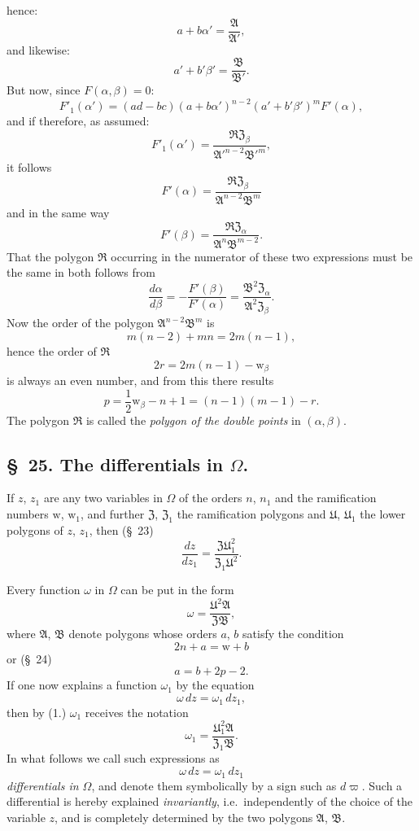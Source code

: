 \documentclass{article}
\begin{document}
hence:
\[ a+b\alpha' = \frac{\mathfrak{A}}{\mathfrak{A}'}, \]
and likewise:
\[ a'+b'\beta' = \frac{\mathfrak{B}}{\mathfrak{B}'}. \]
But now, since $F(\alpha, \beta) = 0$:
\[ F'_{1}(\alpha') = (ad-bc)(a+b\alpha')^{n-2}(a'+b'\beta')^{m}F'(\alpha), \]
and if therefore, as assumed:
\[ F'_{1}(\alpha') = \frac{\mathfrak{R}\mathfrak{Z}_{\beta}}{\mathfrak{A}'^{n-2}\mathfrak{B}'^{m}}, \]
it follows
\[ F'(\alpha) = \frac{\mathfrak{R}\mathfrak{Z}_{\beta}}{\mathfrak{A}^{n-2}\mathfrak{B}^{m}} \]
and in the same way
\[ F'(\beta) = \frac{\mathfrak{R}\mathfrak{Z}_{\alpha}}{\mathfrak{A}^{n}\mathfrak{B}^{m-2}}. \]
That the polygon $\mathfrak{R}$ occurring in the numerator of these two expressions must be the same in both follows from
\[ \frac{d\alpha}{d\beta} = -\frac{F'(\beta)}{F'(\alpha)} = \frac{\mathfrak{B}^{2}\mathfrak{Z}_{\alpha}}{\mathfrak{A}^{2}\mathfrak{Z}_{\beta}}. \]
Now the order of the polygon $\mathfrak{A}^{n-2}\mathfrak{B}^{m}$ is
\[ m(n-2)+mn = 2m(n-1), \]
hence the order of $\mathfrak{R}$
\[ 2r = 2m(n-1)-\mathrm{w}_{\beta} \]
is always an even number, and from this there results
\[ p = \frac{1}{2}\mathrm{w}_{\beta}-n+1 = (n-1)(m-1)-r. \tag{3.} \]
The polygon $\mathfrak{R}$ is called the \emph{polygon of the double points} in $(\alpha, \beta)$.

\subsection*{§~25. The differentials in $\Omega$.}

If $z$, $z_{1}$ are any two variables in $\Omega$ of the orders $n$, $n_{1}$ and the ramification numbers $\mathrm{w}$, $\mathrm{w}_{1}$, and further $\mathfrak{Z}$, $\mathfrak{Z}_{1}$ the ramification polygons and $\mathfrak{U}$, $\mathfrak{U}_{1}$ the lower polygons of $z$, $z_{1}$, then (§~23)
\[ \frac{dz}{dz_{1}} = \frac{\mathfrak{Z}\mathfrak{U}_{1}^{2}}{\mathfrak{Z}_{1}\mathfrak{U}^{2}}. \tag{1.} \]

Every function $\omega$ in $\Omega$ can be put in the form
\[ \omega = \frac{\mathfrak{U}^{2}\mathfrak{A}}{\mathfrak{Z}\mathfrak{B}}, \tag{2.} \]
where $\mathfrak{A}$, $\mathfrak{B}$ denote polygons whose orders $a$, $b$ satisfy the condition
\[ 2n+a = \mathrm{w}+b \]
or (§~24)
\[ a = b+2p-2. \tag{3.} \]
If one now explains a function $\omega_{1}$ by the equation
\[ \omega\,dz = \omega_{1}\,dz_{1}, \]
then by (1.) $\omega_{1}$ receives the notation
\[ \omega_{1} = \frac{\mathfrak{U}_{1}^{2}\mathfrak{A}}{\mathfrak{Z}_{1}\mathfrak{B}}. \]
In what follows we call such expressions as
\[ \omega\,dz = \omega_{1}\,dz_{1} \]
\emph{differentials in $\Omega$}, and denote them symbolically by a sign such as $d\varpi$. Such a differential is hereby explained \emph{invariantly}, i.e.\ independently of the choice of the variable $z$, and is completely determined by the two polygons $\mathfrak{A}$, $\mathfrak{B}$.
\end{document}
